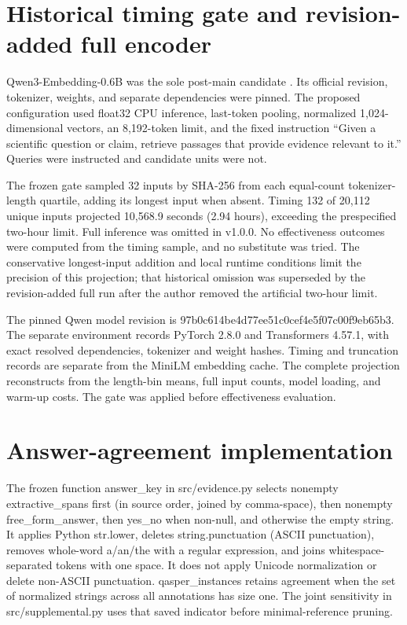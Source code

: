 \documentclass[twoside,a4paper,11pt]{article}
\begin{document}
\section{Historical timing gate and revision-added full encoder}
Qwen3-Embedding-0.6B was the sole post-main candidate \citep{qwen}. Its official revision, tokenizer, weights, and separate dependencies were pinned. The proposed configuration used float32 CPU inference, last-token pooling, normalized 1,024-dimensional vectors, an 8,192-token limit, and the fixed instruction ``Given a scientific question or claim, retrieve passages that provide evidence relevant to it.'' Queries were instructed and candidate units were not.

The frozen gate sampled 32 inputs by SHA-256 from each equal-count tokenizer-length quartile, adding its longest input when absent. Timing 132 of 20,112 unique inputs projected 10,568.9 seconds (2.94 hours), exceeding the prespecified two-hour limit. Full inference was omitted in v1.0.0. No effectiveness outcomes were computed from the timing sample, and no substitute was tried. The conservative longest-input addition and local runtime conditions limit the precision of this projection; that historical omission was superseded by the revision-added full run after the author removed the artificial two-hour limit.

The pinned Qwen model revision is 97b0c614be4d77ee51c0cef4e5f07c00f9eb65b3. The separate environment records PyTorch 2.8.0 and Transformers 4.57.1, with exact resolved dependencies, tokenizer and weight hashes. Timing and truncation records are separate from the MiniLM embedding cache. The complete projection reconstructs from the length-bin means, full input counts, model loading, and warm-up costs. The gate was applied before effectiveness evaluation.


\section{Answer-agreement implementation}
The frozen function answer\_key in src/evidence.py selects nonempty extractive\_spans first (in source order, joined by comma-space), then nonempty free\_form\_answer, then yes\_no when non-null, and otherwise the empty string. It applies Python str.lower, deletes string.punctuation (ASCII punctuation), removes whole-word a/an/the with a regular expression, and joins whitespace-separated tokens with one space. It does not apply Unicode normalization or delete non-ASCII punctuation. qasper\_instances retains agreement when the set of normalized strings across all annotations has size one. The joint sensitivity in src/supplemental.py uses that saved indicator before minimal-reference pruning.
\end{document}
